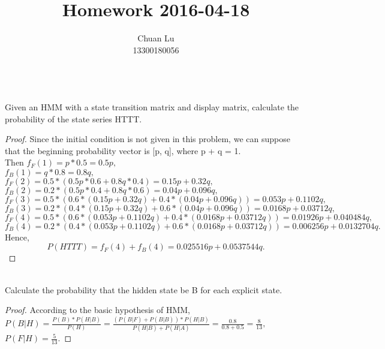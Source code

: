\documentclass{article}
\newenvironment{problem}[2][Problem]{\begin{trivlist}
\item[\hskip \labelsep {\bfseries #1}\hskip \labelsep {\bfseries #2.}]}{\end{trivlist}}
\begin{document}
\title{Homework 2016-04-18}
\author{Chuan Lu\\
13300180056}

\maketitle

\begin{problem}{1}
\text{ }\\
Given an HMM with a state transition matrix and display matrix, calculate the probability of the state series HTTT.
\end{problem}
\begin{proof}
Since the initial condition is not given in this problem, we can suppose that the beginning probability vector is [p, q], where p + q = 1. \\
Then $f_{F}(1) = p * 0.5 = 0.5p,$ \\
$f_{B}(1) = q * 0.8 = 0.8q,$ \\
$f_{F}(2) = 0.5*(0.5p*0.6+0.8q*0.4) = 0.15p+0.32q,$ \\ 
$f_{B}(2) = 0.2*(0.5p*0.4+0.8q*0.6) = 0.04p+0.096q,$ \\ 
$f_{F}(3) = 0.5*(0.6*(0.15p+0.32q)+0.4*(0.04p+0.096q)) = 0.053p+0.1102q,$ \\
$f_{B}(3) = 0.2*(0.4*(0.15p+0.32q)+0.6*(0.04p+0.096q)) = 0.0168p+0.03712q,$ \\
$f_{F}(4) = 0.5*(0.6*(0.053p+0.1102q)+0.4*(0.0168p+0.03712q)) = 0.01926p+0.040484q,$ \\
$f_{B}(4) = 0.2*(0.4*(0.053p+0.1102q)+0.6*(0.0168p+0.03712q)) = 0.006256p+0.0132704q.$ \\
Hence, $$P(HTTT) = f_{F}(4) + f_{B}(4) = 0.025516p+0.0537544q.$$
\end{proof}


\begin{problem}{2}
\text{ }\\
Calculate the probability that the hidden state be B for each explicit state.
\end{problem}
\begin{proof}
According to the basic hypothesis of HMM, \\
$P(B|H) = \frac{P(B)*P(H|B)}{P(H)} = \frac{(P(B|F)+P(B|B))*P(H|B)}{P(H|B)+P(H|A)} = \frac{0.8}{0.8+0.5} = \frac{8}{13},$ \\
$P(F|H) = \frac{5}{13}.$
\end{proof}
\end{document}
